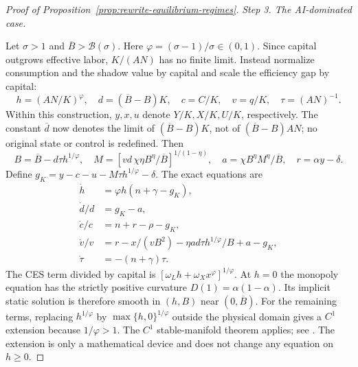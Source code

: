 \begin{proof}[Proof of Proposition~\ref{prop:rewrite-equilibrium-regimes}]
\par\medskip\noindent\textit{Step 3. The AI-dominated case.}

Let $\sigma>1$ and $\overline B>\mathcal B(\sigma)$.
Here $\varphi=(\sigma-1)/\sigma\in(0,1)$. Since capital outgrows effective
labor, $K/(AN)$ has no finite limit. Instead normalize consumption and the
shadow value by capital and scale the efficiency gap by capital:
\[
 h=(AN/K)^\varphi,\quad d=(\overline B-B)K,\quad
 c=C/K,\quad v=q/K,\quad \tau=(AN)^{-1}.
\]
Within this construction, $y,x,u$ denote $Y/K,X/K,U/K$, respectively.
The constant $\overline d$ now denotes the limit of $(\overline B-B)K$,
not of $(\overline B-B)AN$; no original state or control is redefined.
Then
\[
 B=\overline B-d\tau h^{1/\varphi},\quad
 M=\left[vd\,\chi\eta B^\eta/\overline B\right]^{1/(1-\eta)},\quad
 a=\chi B^\eta M^\eta/\overline B,\quad r=\alpha y-\delta.
\]
Define $g_K=y-c-u-M\tau h^{1/\varphi}-\delta$.
The exact equations are
\begin{subequations}
\label{eq:rewrite-ai-proof-dynamics}
\begin{align}
 \dot h&=\varphi h(n+\gamma-g_K),\\
 \dot d/d&=g_K-a,\\
 \dot c/c&=n+r-\rho-g_K,\\
 \dot v/v&=r-x/(vB^2)-\eta ad\tau h^{1/\varphi}/B+a-g_K,\\
 \dot\tau&=-(n+\gamma)\tau.
\end{align}
\end{subequations}
The CES term divided by capital is
$[\omega_Lh+\omega_Xx^\varphi]^{1/\varphi}$.
At $h=0$ the monopoly equation has the strictly positive curvature
$D(1)=\alpha(1-\alpha)$. Its implicit static solution is therefore smooth
in $(h,B)$ near $(0,\overline B)$. For the remaining terms, replacing
$h^{1/\varphi}$ by $\max\{h,0\}^{1/\varphi}$ outside the physical domain
gives a $C^1$ extension because $1/\varphi>1$. The $C^1$ stable-manifold
theorem applies; see \citet[p.~7]{feldman2021stable}. The extension is only a
mathematical device and does not change any equation on $h\geq0$.


\end{proof}
